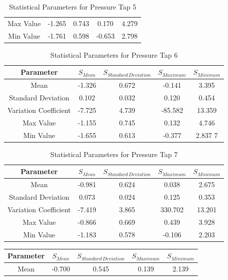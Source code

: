 \documentclass[11pt,a4paper,titlepage]{report}
\begin{document}
\begin{appendix}
\begin{table}[h]
\begin{tabular}{c|c|c|c|c}
Max Value             & -1.265 & 0.743 & 0.170   & 4.279  \\
Min Value             & -1.761 & 0.598 & -0.653  & 2.798 
    \end{tabular}
    \caption{Statistical Parameters for Pressure Tap 5}
    \label{tab:wind statistical parameters 5}
\end{table}
\begin{table}[h]
    \centering
    \begin{tabular}{c|c|c|c|c}
  Parameter   & $S_{Mean}$ & $S_{Standard\,Deviation}$ & $S_{Maximum}$ &	$S_{Minimum}$ \\
    \hline
Mean                  & -1.326 & 0.672 & -0.141  & 3.395  \\
Standard Deviation    & 0.102  & 0.032 & 0.120   & 0.454  \\
Variation Coefficient & -7.725 & 4.739 & -85.582 & 13.359 \\
Max Value             & -1.155 & 0.745 & 0.132   & 4.746  \\
Min Value             & -1.655 & 0.613 & -0.377  & 2.837 7
    \end{tabular}
    \caption{Statistical Parameters for Pressure Tap 6}
    \label{tab:wind statistical parameters 6}
\end{table}
\begin{table}[h]
    \centering
    \begin{tabular}{c|c|c|c|c}
   Parameter  & $S_{Mean}$ & $S_{Standard\,Deviation}$ & $S_{Maximum}$ &	$S_{Minimum}$ \\
    \hline
Mean                  & -0.981 & 0.624 & 0.038   & 2.675  \\
Standard Deviation    & 0.073  & 0.024 & 0.125   & 0.353  \\
Variation Coefficient & -7.419 & 3.865 & 330.702 & 13.201 \\
Max Value             & -0.866 & 0.669 & 0.439   & 3.928  \\
Min Value             & -1.183 & 0.578 & -0.106  & 2.203 
    \end{tabular}
    \caption{Statistical Parameters for Pressure Tap 7}
    \label{tab:wind statistical parameters 7}
\end{table}
\begin{table}[h]
    \centering
    \begin{tabular}{c|c|c|c|c}
   Parameter  & $S_{Mean}$ & $S_{Standard\,Deviation}$ & $S_{Maximum}$ &	$S_{Minimum}$ \\
    \hline
 Mean                  & -0.700 & 0.545 & 0.139  & 2.139  \\

\end{tabular}
\end{table}
\end{appendix}
\end{document}
